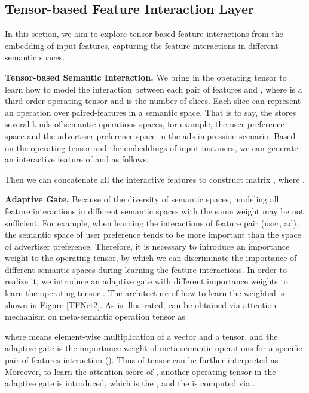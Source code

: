 \documentclass[sigconf]{acmart}
\begin{document}
\subsection{Tensor-based Feature Interaction Layer} In this section, we aim to explore tensor-based feature interactions from the embedding of input features, capturing the feature interactions in different semantic spaces. 


\textbf{Tensor-based Semantic Interaction.} We bring in the operating tensor  to learn how to model the interaction between each pair of features  and , where  is a third-order operating tensor and  is the number of slices. Each slice  can represent an operation over paired-features in a semantic space. That is to say, the  stores several kinds of semantic operations spaces, for example, the user preference space and the advertiser preference space in the ads impression scenario. Based on the operating tensor  and the embeddings of input instances, we can generate an interactive feature  of  and  as follows,

Then we can concatenate all the interactive features to construct matrix , where . 






\textbf{Adaptive Gate.} Because of the diversity of semantic spaces, modeling all feature interactions in different semantic spaces with the same weight  may be not sufficient. For example, when learning the interactions of feature pair (user, ad), the semantic space of user preference tends to be more important than the space of advertiser preference. Therefore, it is necessary to introduce an importance weight to the operating tensor, by which we can discriminate the importance of different semantic spaces during learning the feature interactions. In order to realize it, we introduce an adaptive gate with different importance weights to learn the operating tensor  . The architecture of how to learn the weighted  is shown in Figure \ref{TFNet2}. As is illustrated,  can be obtained via attention mechanism on meta-semantic operation tensor  as 

where  means element-wise multiplication of a vector and a tensor, and the adaptive gate  is the importance weight of meta-semantic operations for a specific pair of features interaction (). Thus  of tensor  can be further interpreted as . Moreover, to learn the attention score of , another operating tensor in the adaptive gate is introduced, which is the , and the  is computed via . 
\end{document}
